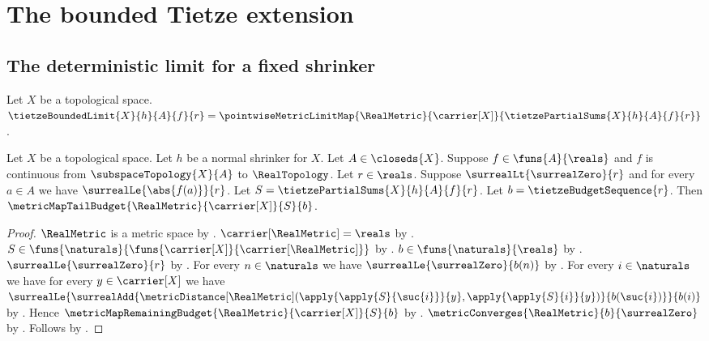 



\section{The bounded Tietze extension}

\subsection{The deterministic limit for a fixed shrinker}

\begin{definition}\label{tietze_bounded_limit}
    Let $X$ be a topological space.
    $\tietzeBoundedLimit{X}{h}{A}{f}{r}
        =\pointwiseMetricLimitMap{\RealMetric}{\carrier[X]}
            {\tietzePartialSums{X}{h}{A}{f}{r}}$.
\end{definition}

\begin{theorem}\label{tietze_partial_sums_tail_budget}
    Let $X$ be a topological space.
    Let $h$ be a normal shrinker for $X$.
    Let $A\in\closeds{X}$.
    Suppose $f\in\funs{A}{\reals}$ and $f$ is continuous from
        $\subspaceTopology{X}{A}$ to $\RealTopology$.
    Let $r\in\reals$.
    Suppose $\surrealLt{\surrealZero}{r}$ and
        for every $a\in A$ we have $\surrealLe{\abs{f(a)}}{r}$.
    Let $S=\tietzePartialSums{X}{h}{A}{f}{r}$.
    Let $b=\tietzeBudgetSequence{r}$.
    Then
        $\metricMapTailBudget{\RealMetric}{\carrier[X]}{S}{b}$.
\end{theorem}
\begin{proof}
    $\RealMetric$ is a metric space
        by .
    $\carrier[\RealMetric]=\reals$
        by .
    $S\in\funs{\naturals}{\funs{\carrier[X]}{\carrier[\RealMetric]}}$
        by .
    $b\in\funs{\naturals}{\reals}$
        by .
    $\surrealLe{\surrealZero}{r}$
        by
        .
    For every $n\in\naturals$ we have
        $\surrealLe{\surrealZero}{b(n)}$
        by .
    For every $i\in\naturals$ we have for every
        $y\in\carrier[X]$ we have
        $\surrealLe{
            \surrealAdd{
                \metricDistance[\RealMetric]
                    (\apply{\apply{S}{\suc{i}}}{y},
                     \apply{\apply{S}{i}}{y})}
                {b(\suc{i})}}
            {b(i)}$
        by .
    Hence
        $\metricMapRemainingBudget{\RealMetric}{\carrier[X]}{S}{b}$
        by .
    $\metricConverges{\RealMetric}{b}{\surrealZero}$
        by .
    Follows by .
\end{proof}

